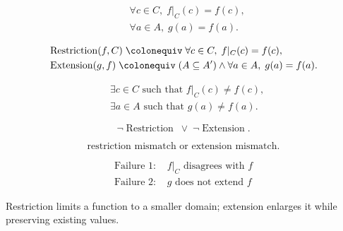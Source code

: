 \begin{remark*}
\[
\begin{aligned}
&\forall c \in C,\; f|_C(c) = f(c), \\
&\forall a \in A,\; g(a) = f(a).
\end{aligned}
\]
\end{remark*}

\begin{remark*}
\[
\begin{aligned}
&\operatorname{Restriction}(f,C)
\;\colonequiv\;
\forall c \in C,\; f|_C(c)=f(c), \\
&\operatorname{Extension}(g,f)
\;\colonequiv\;
(A \subseteq A') \land
\forall a \in A,\; g(a)=f(a).
\end{aligned}
\]
\end{remark*}

\begin{remark*}
\[
\begin{aligned}
&\exists c \in C \text{ such that } f|_C(c) \ne f(c), \\
&\exists a \in A \text{ such that } g(a) \ne f(a).
\end{aligned}
\]
\end{remark*}

\begin{remark*}
\[
\neg \operatorname{Restriction}
\;\lor\;
\neg \operatorname{Extension}.
\]
\end{remark*}

\begin{remark*}
\[
\text{restriction mismatch or extension mismatch}.
\]
\end{remark*}

\begin{remark*}
\[
\begin{aligned}
\text{Failure 1: } &f|_C \text{ disagrees with } f \\
\text{Failure 2: } &g \text{ does not extend } f
\end{aligned}
\]
\end{remark*}

\begin{remark*}[Interpretation]
Restriction limits a function to a smaller domain; extension enlarges it
while preserving existing values.
\end{remark*}


